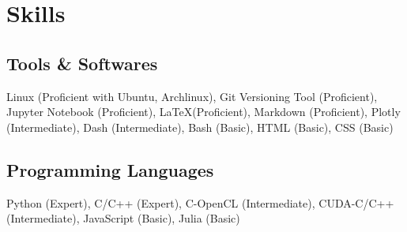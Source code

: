 \documentclass[]{resume}
\begin{document}
\begin{minipage}[t]{0.5\textwidth}
    \section{Skills}

    \subsection{Tools \& Softwares}
    Linux (Proficient with Ubuntu, Archlinux),
    Git Versioning Tool (Proficient),
    Jupyter Notebook (Proficient),
    \LaTeX (Proficient),
    Markdown (Proficient),
    Plotly (Intermediate),
    Dash (Intermediate), Bash (Basic),
    HTML (Basic), CSS (Basic)\\

    \subsection{Programming Languages}
    Python (Expert), C/C++ (Expert), C-OpenCL (Intermediate), CUDA-C/C++ (Intermediate), JavaScript (Basic), Julia (Basic)


\end{minipage}
\hfill
\end{document}
